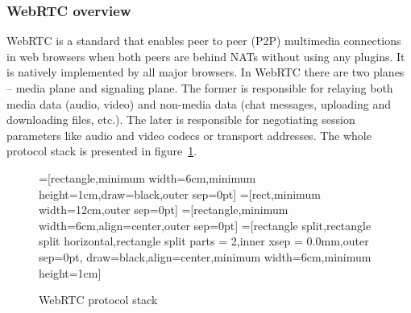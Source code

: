 \subsubsection{WebRTC overview}
\label{subsubsec:webrtc-overview}
WebRTC is a standard that enables peer to peer (P2P) multimedia connections in web browsers when both peers are behind NATs without using any plugins.
It is natively implemented by all major browsers.
In WebRTC there are two planes -- media plane and signaling plane.
The former is responsible for relaying both media data (audio, video) and non-media data (chat messages, uploading and downloading files, etc.).
The later is responsible for negotiating session parameters like audio and video codecs or transport addresses.
The whole protocol stack is presented in figure~\ref{fig:webrtc-stack}.

\begin{figure}[h]
    \centering
    =[rectangle,minimum width=6cm,minimum height=1cm,draw=black,outer sep=0pt]
    =[rect,minimum width=12cm,outer sep=0pt]
    =[rectangle,minimum width=6cm,align=center,outer sep=0pt]
    =[rectangle split,rectangle split horizontal,rectangle split parts = 2,inner xsep = 0.0mm,outer sep=0pt,
    draw=black,align=center,minimum width=6cm,minimum height=1cm]
    \caption{WebRTC protocol stack}
    \label{fig:webrtc-stack}
\end{figure}

